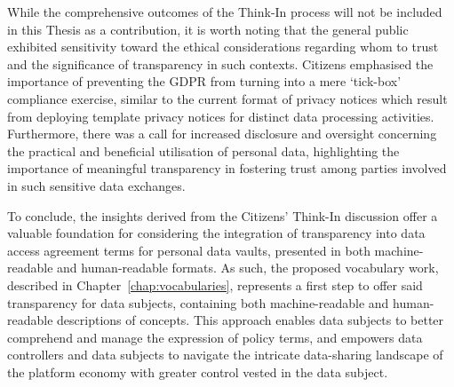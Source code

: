 While the comprehensive outcomes of the Think-In process will not be included in this Thesis as a contribution, it is worth noting that the general public exhibited sensitivity toward the ethical considerations regarding whom to trust and the significance of transparency in such contexts.
Citizens emphasised the importance of preventing the GDPR from turning into a mere `tick-box' compliance exercise, similar to the current format of privacy notices which result from deploying template privacy notices for distinct data processing activities.
Furthermore, there was a call for increased disclosure and oversight concerning the practical and beneficial utilisation of personal data, highlighting the importance of meaningful transparency in fostering trust among parties involved in such sensitive data exchanges.

To conclude, the insights derived from the Citizens' Think-In discussion offer a valuable foundation for considering the integration of transparency into data access agreement terms for personal data vaults, presented in both machine-readable and human-readable formats.
As such, the proposed vocabulary work, described in Chapter~\ref{chap:vocabularies}, represents a first step to offer said transparency for data subjects, containing both machine-readable and human-readable descriptions of concepts.
This approach enables data subjects to better comprehend and manage the expression of policy terms, and empowers data controllers and data subjects to navigate the intricate data-sharing landscape of the platform economy with greater control vested in the data subject.